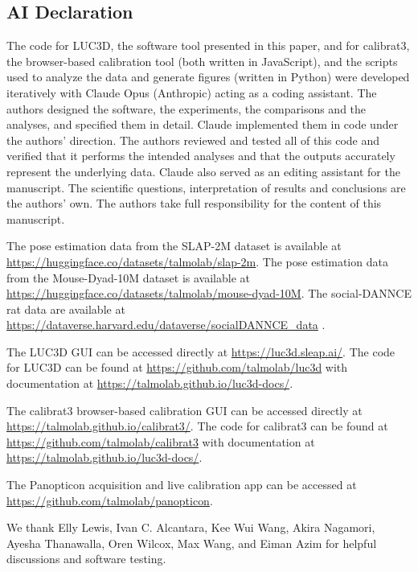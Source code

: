 \documentclass[pdflatex, sn-nature]{sn-jnl}
\theoremstyle{thmstyleone}%
\theoremstyle{thmstyletwo}%
\theoremstyle{thmstylethree}%
\begin{document}
\subsection{AI Declaration}\label{methods-ai}
The code for LUC3D, the software tool presented in this paper, and for calibrat3, the browser-based calibration tool (both written in JavaScript), and the scripts used to analyze the data and generate figures (written in Python) were developed iteratively with Claude Opus (Anthropic) acting as a coding assistant. The authors designed the software, the experiments, the comparisons and the analyses, and specified them in detail. Claude implemented them in code under the authors' direction. The authors reviewed and tested all of this code and verified that it performs the intended analyses and that the outputs accurately represent the underlying data. Claude also served as an editing assistant for the manuscript. The scientific questions, interpretation of results and conclusions are the authors' own. The authors take full responsibility for the content of this manuscript.

The pose estimation data from the SLAP-2M dataset is available at \url{https://huggingface.co/datasets/talmolab/slap-2m}. The pose estimation data from the Mouse-Dyad-10M dataset is available at \url{https://huggingface.co/datasets/talmolab/mouse-dyad-10M}. The social-DANNCE rat data are available at \url{https://dataverse.harvard.edu/dataverse/socialDANNCE_data} \citep{Klibaite2025}.

The LUC3D GUI can be accessed directly at \url{https://luc3d.sleap.ai/}. The code for LUC3D can be found at \url{https://github.com/talmolab/luc3d} with documentation at \url{https://talmolab.github.io/luc3d-docs/}. 

The calibrat3 browser-based calibration GUI can be accessed directly at  \url{https://talmolab.github.io/calibrat3/}. The code for calibrat3 can be found at  \url{https://github.com/talmolab/calibrat3} with documentation at  \url{https://talmolab.github.io/luc3d-docs/}. 

The Panopticon acquisition and live calibration app can be accessed at \url{https://github.com/talmolab/panopticon}.

\backmatter

We thank Elly Lewis, Ivan C. Alcantara, Kee Wui Wang, Akira Nagamori, Ayesha Thanawalla, Oren Wilcox, Max Wang, and Eiman Azim for helpful discussions and software testing.
\end{document}
